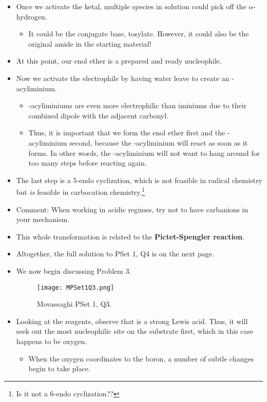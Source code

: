 \documentclass[../notes.tex]{subfiles}
\begin{document}
\begin{itemize}
    \item Once we activate the ketal, multiple species in solution could pick off the $\alpha$-hydrogen.
    \begin{itemize}
        \item It could be the conjugate base, tosylate. However, it could also be the original amide in the starting material!
    \end{itemize}
    \item At this point, our enol ether is a prepared and ready nucleophile.
    \item Now we activate the electrophile by having water leave to create an -acyliminium.
    \begin{itemize}
        \item {}-acyliminiums are even more electrophilic than iminiums due to their combined dipole with the adjacent carbonyl.
        \item Thus, it is important that we form the enol ether first and the -acyliminium second, because the -acyliminium will react as soon as it forms. In other words, the -acyliminium will not want to hang around for too many steps before reacting again.
    \end{itemize}
    \item The last step is a 5-endo cyclization, which is not feasible in radical chemistry but \emph{is} feasible in carbocation chemistry.\footnote{Is it not a 6-endo cyclization??}
    \item Comment: When working in acidic regimes, try not to have carbanions in your mechanism.
    \item This whole transformation is related to the \textbf{Pictet-Spengler reaction}.
    \item Altogether, the full solution to PSet 1, Q4 is on the next page.
    
    \item We now begin discussing Problem 3.
    \begin{figure}[h!]
        \centering
        \texttt{[image: MPSet1Q3.png]}
        \caption{Movassaghi PSet 1, Q3.}
        \label{fig:MPSet1Q3}
    \end{figure}
    \item Looking at the reagents, observe that  is a strong Lewis acid. Thus, it will seek out the most nucleophilic site on the substrate first, which in this case happens to be oxygen.
    \begin{itemize}
        \item When the oxygen coordinates to the boron, a number of subtle changes begin to take place.

\end{itemize}
\end{itemize}
\end{document}
